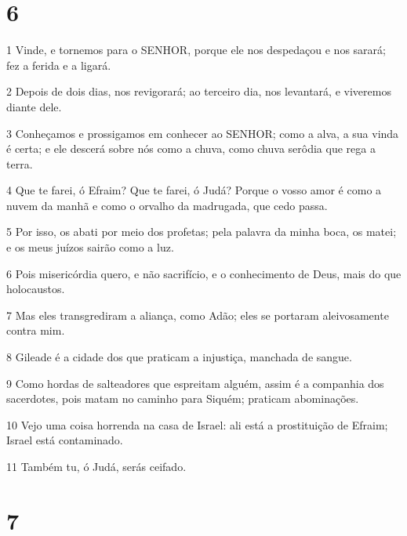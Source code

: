 \chapter{6}

\par 1 Vinde, e tornemos para o SENHOR, porque ele nos despedaçou e nos sarará; fez a ferida e a ligará.
\par 2 Depois de dois dias, nos revigorará; ao terceiro dia, nos levantará, e viveremos diante dele.
\par 3 Conheçamos e prossigamos em conhecer ao SENHOR; como a alva, a sua vinda é certa; e ele descerá sobre nós como a chuva, como chuva serôdia que rega a terra.
\par 4 Que te farei, ó Efraim? Que te farei, ó Judá? Porque o vosso amor é como a nuvem da manhã e como o orvalho da madrugada, que cedo passa.
\par 5 Por isso, os abati por meio dos profetas; pela palavra da minha boca, os matei; e os meus juízos sairão como a luz.
\par 6 Pois misericórdia quero, e não sacrifício, e o conhecimento de Deus, mais do que holocaustos.
\par 7 Mas eles transgrediram a aliança, como Adão; eles se portaram aleivosamente contra mim.
\par 8 Gileade é a cidade dos que praticam a injustiça, manchada de sangue.
\par 9 Como hordas de salteadores que espreitam alguém, assim é a companhia dos sacerdotes, pois matam no caminho para Siquém; praticam abominações.
\par 10 Vejo uma coisa horrenda na casa de Israel: ali está a prostituição de Efraim; Israel está contaminado.
\par 11 Também tu, ó Judá, serás ceifado.

\chapter{7}


